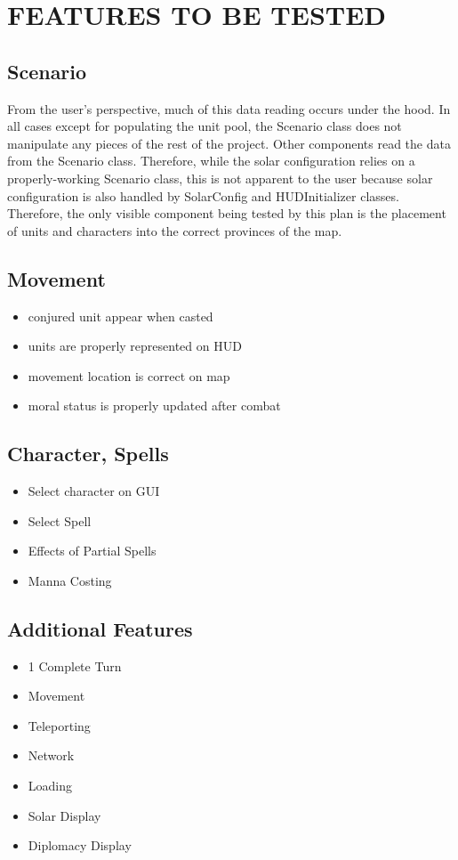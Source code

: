 \section[FEATURES TO BE TESTED]{\bfseries\color{black} FEATURES TO BE TESTED}
{\color{black}
\subsection{Scenario}
From the user's perspective, much of this data reading occurs under the hood. 
In all cases except for populating the unit pool, the Scenario class does not 
manipulate any pieces of the rest of the project. Other components read the 
data from the Scenario class. Therefore, while the solar configuration relies 
on a properly-working Scenario class, this is not apparent to the user because 
solar configuration is also handled by SolarConfig and HUDInitializer classes.
\newline
\newline
Therefore, the only visible component being tested by this plan is the placement 
of units and characters into the correct provinces of the map.

\subsection{Movement}

\begin{itemize}
\item conjured unit appear when casted
\item units are properly represented on HUD
\item movement location is correct on map
\item moral status is properly updated after combat
\end{itemize}

\subsection{Character, Spells}
\begin{itemize}
\item Select character on GUI
\item Select Spell
\item Effects of Partial Spells
\item Manna Costing
\end{itemize}
}

{\color{black}
\subsection {Additional Features}
\begin{itemize}
\item 1 Complete Turn
\item Movement
\item Teleporting
\item Network 
\item Loading
\item Solar Display
\item Diplomacy Display
\end{itemize}
}

